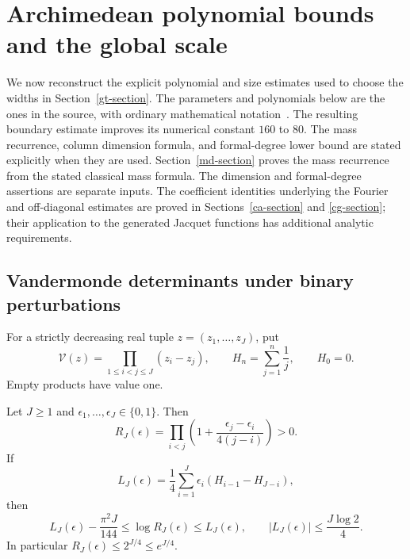 \section{Archimedean polynomial bounds and the global scale}
\label{as-section}

We now reconstruct the explicit polynomial and size estimates used
to choose the widths in Section~\ref{gt-section}.  The parameters
and polynomials below are the ones in the source, with ordinary
mathematical notation~\cite{alpo-uniform-source}.  The resulting boundary estimate improves
its numerical constant $160$ to $80$.  The mass recurrence, column
dimension formula, and formal-degree lower bound are stated
explicitly when they are used. Section~\ref{md-section} proves the
mass recurrence from the stated classical mass formula. The dimension
and formal-degree assertions are separate inputs. The coefficient
identities underlying the Fourier and off-diagonal estimates are
proved in Sections~\ref{ca-section} and \ref{cg-section}; their
application to the generated Jacquet functions has additional
analytic requirements.

\subsection{Vandermonde determinants under binary perturbations}

For a strictly decreasing real tuple $z=(z_1,\ldots,z_J)$, put
\[
 \mathcal V(z)=\prod_{1\leq i<j\leq J}(z_i-z_j),
 \qquad H_n=\sum_{j=1}^n\frac1j,\qquad H_0=0.
\]
Empty products have value one.

\begin{lemma}\label{as-vandermonde}
Let $J\geq1$ and $\epsilon_1,\ldots,\epsilon_J\in\{0,1\}$.
Then
\[
 R_J(\epsilon)=\prod_{i<j}
       \left(1+\frac{\epsilon_j-\epsilon_i}{4(j-i)}\right)>0.
\]
If
\[
 L_J(\epsilon)=\frac14\sum_{i=1}^J
               \epsilon_i(H_{i-1}-H_{J-i}),
\]
then
\begin{equation}\label{as-log-vand}
 L_J(\epsilon)-\frac{\pi^2J}{144}
       \leq\log R_J(\epsilon)\leq L_J(\epsilon),
 \qquad |L_J(\epsilon)|\leq\frac{J\log2}{4}.
\end{equation}
In particular $R_J(\epsilon)\leq2^{J/4}\leq e^{J/4}$.
\end{lemma}

